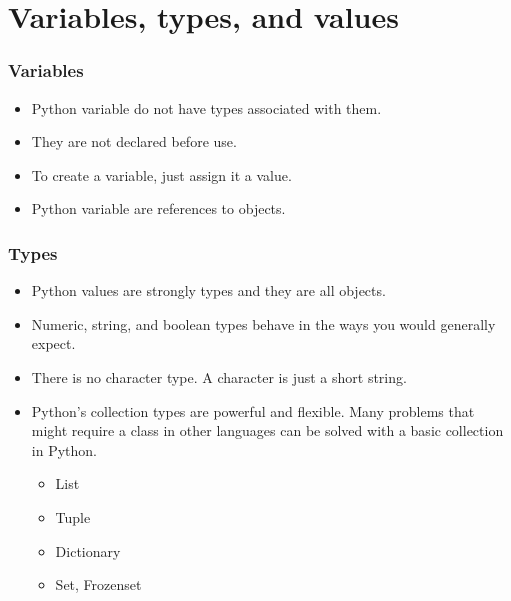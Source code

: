 \documentclass[10pt]{beamer}
\begin{document}
\section{Variables, types, and values}
\begin{frame}
	\frametitle{Variables}
	\begin{itemize}
		\item Python variable do not have types associated with them.
		\item They are not declared before use.
		\item To create a variable, just assign it a value.
		\item Python variable are references to objects.
	\end{itemize}
\end{frame}
\begin{frame}
	\frametitle{Types}
	\begin{itemize}
		\item Python values are strongly types and they are all objects.
		\item Numeric, string, and boolean types behave in the ways you would generally expect.
		\item There is no character type.  A character is just a short string.
		\item Python's collection types are powerful and flexible. Many problems that
			might require a class in other languages can be solved with a 
			basic collection in Python.
			\begin{itemize}
				\item List
				\item Tuple
				\item Dictionary
				\item Set, Frozenset
			\end{itemize}
	\end{itemize}
\end{frame}
\end{document}
